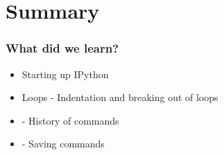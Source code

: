 \documentclass[14pt,compress]{beamer}
\newcommand{\kwrd}[1]{ \texttt{\textbf{\color{blue}{#1}}}  }
\begin{document}
\section{Summary}
\begin{frame}[fragile]
  \frametitle{What did we learn?}
  \begin{itemize}
    \item Starting up IPython
    \item Loops - Indentation and breaking out of loops
    \item \kwrd{\%hist} - History of commands
    \item \kwrd{\%save} - Saving commands 
  \end{itemize}
\end{frame}
\end{document}
